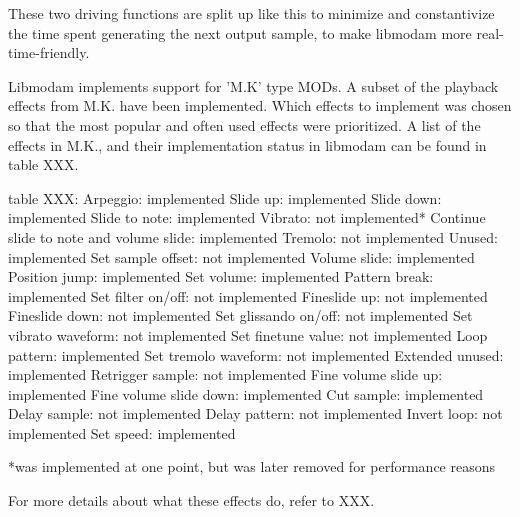 These two driving functions are split up like this to minimize and constantivize the time spent generating the next output sample, to make libmodam more real-time-friendly.

Libmodam implements support for 'M.K' type MODs.
A subset of the playback effects from M.K. have been implemented.
Which effects to implement was chosen so that the most popular and often used effects were prioritized.
A list of the effects in M.K., and their implementation status in libmodam can be found in table XXX.

table XXX:
Arpeggio: implemented
Slide up: implemented
Slide down: implemented
Slide to note: implemented
Vibrato: not implemented*
Continue slide to note and volume slide: implemented
Tremolo: not implemented
Unused: implemented
Set sample offset: not implemented
Volume slide: implemented
Position jump: implemented
Set volume: implemented
Pattern break: implemented
Set filter on/off: not implemented
Fineslide up: not implemented
Fineslide down: not implemented
Set glissando on/off: not implemented
Set vibrato waveform: not implemented
Set finetune value: not implemented
Loop pattern: implemented
Set tremolo waveform: not implemented
Extended unused: implemented
Retrigger sample: not implemented
Fine volume slide up: implemented
Fine volume slide down: implemented
Cut sample: implemented
Delay sample: not implemented
Delay pattern: not implemented
Invert loop: not implemented
Set speed: implemented

*was implemented at one point, but was later removed for performance reasons


For more details about what these effects do, refer to XXX.






